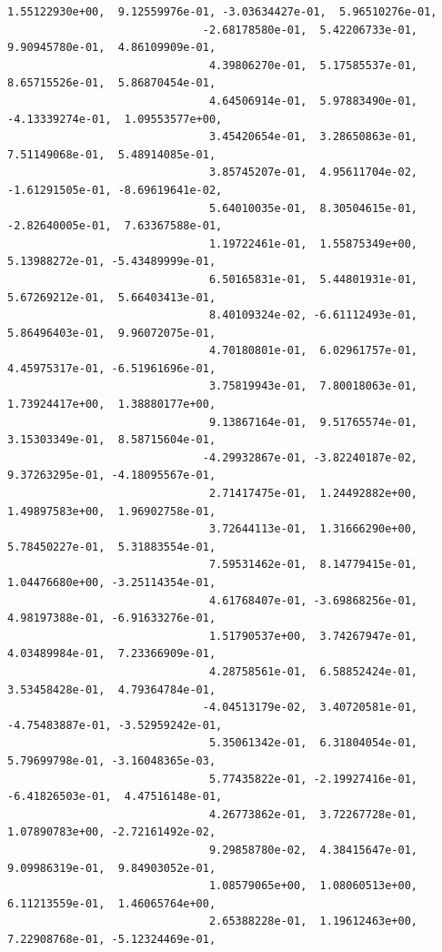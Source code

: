 \documentclass[11pt]{article}
\begin{document}
\begin{Verbatim}[commandchars=\\\{\}]
                               1.55122930e+00,  9.12559976e-01, -3.03634427e-01,  5.96510276e-01,
                              -2.68178580e-01,  5.42206733e-01,  9.90945780e-01,  4.86109909e-01,
                               4.39806270e-01,  5.17585537e-01,  8.65715526e-01,  5.86870454e-01,
                               4.64506914e-01,  5.97883490e-01, -4.13339274e-01,  1.09553577e+00,
                               3.45420654e-01,  3.28650863e-01,  7.51149068e-01,  5.48914085e-01,
                               3.85745207e-01,  4.95611704e-02, -1.61291505e-01, -8.69619641e-02,
                               5.64010035e-01,  8.30504615e-01, -2.82640005e-01,  7.63367588e-01,
                               1.19722461e-01,  1.55875349e+00,  5.13988272e-01, -5.43489999e-01,
                               6.50165831e-01,  5.44801931e-01,  5.67269212e-01,  5.66403413e-01,
                               8.40109324e-02, -6.61112493e-01,  5.86496403e-01,  9.96072075e-01,
                               4.70180801e-01,  6.02961757e-01,  4.45975317e-01, -6.51961696e-01,
                               3.75819943e-01,  7.80018063e-01,  1.73924417e+00,  1.38880177e+00,
                               9.13867164e-01,  9.51765574e-01,  3.15303349e-01,  8.58715604e-01,
                              -4.29932867e-01, -3.82240187e-02,  9.37263295e-01, -4.18095567e-01,
                               2.71417475e-01,  1.24492882e+00,  1.49897583e+00,  1.96902758e-01,
                               3.72644113e-01,  1.31666290e+00,  5.78450227e-01,  5.31883554e-01,
                               7.59531462e-01,  8.14779415e-01,  1.04476680e+00, -3.25114354e-01,
                               4.61768407e-01, -3.69868256e-01,  4.98197388e-01, -6.91633276e-01,
                               1.51790537e+00,  3.74267947e-01,  4.03489984e-01,  7.23366909e-01,
                               4.28758561e-01,  6.58852424e-01,  3.53458428e-01,  4.79364784e-01,
                              -4.04513179e-02,  3.40720581e-01, -4.75483887e-01, -3.52959242e-01,
                               5.35061342e-01,  6.31804054e-01,  5.79699798e-01, -3.16048365e-03,
                               5.77435822e-01, -2.19927416e-01, -6.41826503e-01,  4.47516148e-01,
                               4.26773862e-01,  3.72267728e-01,  1.07890783e+00, -2.72161492e-02,
                               9.29858780e-02,  4.38415647e-01,  9.09986319e-01,  9.84903052e-01,
                               1.08579065e+00,  1.08060513e+00,  6.11213559e-01,  1.46065764e+00,
                               2.65388228e-01,  1.19612463e+00,  7.22908768e-01, -5.12324469e-01,

\end{Verbatim}
\end{document}
